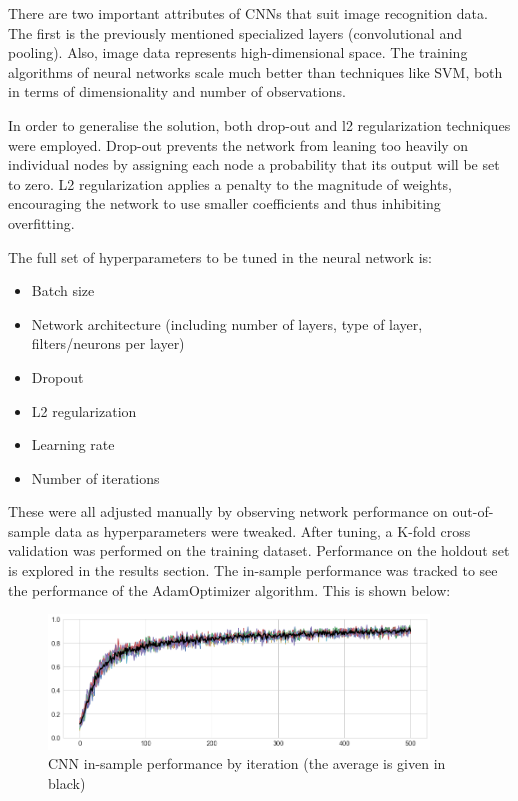 \documentclass[11pt]{article}
\begin{document}
There are two important attributes of CNNs that suit image recognition data. The first is the previously mentioned specialized layers (convolutional and pooling). Also, image data represents high-dimensional space. The training algorithms of neural networks scale much better than techniques like SVM, both in terms of dimensionality and number of observations.

In order to generalise the solution, both drop-out and l2 regularization techniques were employed. Drop-out prevents the network from leaning too heavily on individual nodes by assigning each node a probability that its output will be set to zero. L2 regularization applies a penalty to the magnitude of weights, encouraging the network to use smaller coefficients and thus inhibiting overfitting.

The full set of hyperparameters to be tuned in the neural network is:
\begin{itemize}
\item Batch size
\item Network architecture (including number of layers, type of layer, filters/neurons per layer)
\item Dropout
\item L2 regularization
\item Learning rate
\item Number of iterations
\end{itemize}

These were all adjusted manually by observing network performance on out-of-sample data as hyperparameters were tweaked. After tuning, a K-fold cross validation was performed on the training dataset. Performance on the holdout set is explored in the results section. The in-sample performance was tracked to see the performance of the AdamOptimizer algorithm. This is shown below:

\begin{figure}[h]
\caption{CNN in-sample performance by iteration (the average is given in black)}
\centering
\includegraphics[width=0.9\textwidth]{images/training-progress.png}
\end{figure}
 
\medskip
 
\renewcommand\refname{Bibliography}

 
\end{document}

